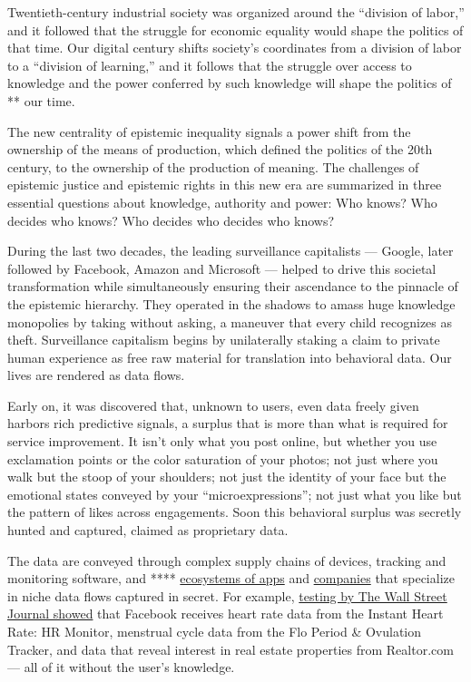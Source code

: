 Twentieth-century industrial society was organized around the ``division
of labor,'' and it followed that the struggle for economic equality
would shape the politics of that time. Our digital century shifts
society's coordinates from a division of labor to a ``division of
learning,'' and it follows that the struggle over access to knowledge
and the power conferred by such knowledge will shape the politics of **
our time.

The new centrality of epistemic inequality signals a power shift from
the ownership of the means of production, which defined the politics of
the 20th century, to the ownership of the production of meaning. The
challenges of epistemic justice and epistemic rights in this new era are
summarized in three essential questions about knowledge, authority and
power: Who knows? Who decides who knows? Who decides who decides who
knows?

During the last two decades, the leading surveillance capitalists ---
Google, later followed by Facebook, Amazon and Microsoft --- helped to
drive this societal transformation while simultaneously ensuring their
ascendance to the pinnacle of the epistemic hierarchy. They operated in
the shadows to amass huge knowledge monopolies by taking without asking,
a maneuver that every child recognizes as theft. Surveillance capitalism
begins by unilaterally staking a claim to private human experience as
free raw material for translation into behavioral data. Our lives are
rendered as data flows.

Early on, it was discovered that, unknown to users, even data freely
given harbors rich predictive signals, a surplus that is more than what
is required for service improvement. It isn't only what you post online,
but whether you use exclamation points or the color saturation of your
photos; not just where you walk but the stoop of your shoulders; not
just the identity of your face but the emotional states conveyed by your
``microexpressions''; not just what you like but the pattern of likes
across engagements. Soon this behavioral surplus was secretly hunted and
captured, claimed as proprietary data.

The data are conveyed through complex supply chains of devices, tracking
and monitoring software, and ****
\href{https://www.wsj.com/articles/you-give-apps-sensitive-personal-information-then-they-tell-facebook-11550851636}{ecosystems
of apps} and
\href{https://fil.forbrukerradet.no/wp-content/uploads/2020/01/2020-01-14-out-of-control-final-version.pdf}{companies}
that specialize in niche data flows captured in secret. For example,
\href{https://www.wsj.com/articles/you-give-apps-sensitive-personal-information-then-they-tell-facebook-11550851636}{testing
by The Wall Street Journal showed} that Facebook receives heart rate
data from the Instant Heart Rate: HR Monitor, menstrual cycle data from
the Flo Period \& Ovulation Tracker, and data that reveal interest in
real estate properties from Realtor.com --- all of it without the user's
knowledge.


